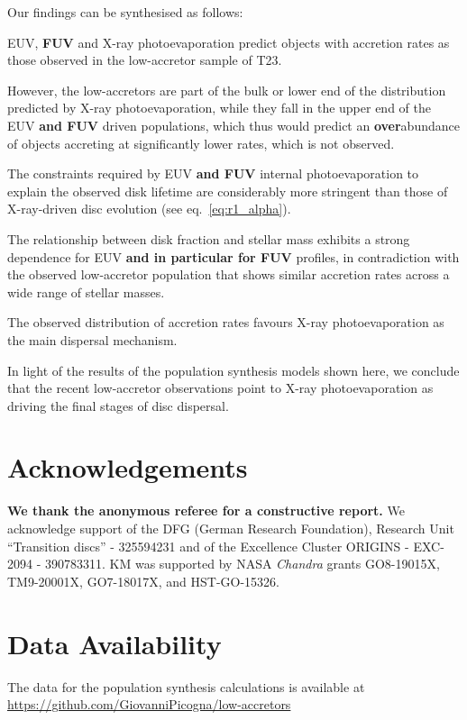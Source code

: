 \documentclass[fleqn,usenatbib]{mnras}
\begin{document}
Our findings can be synthesised as follows:
\begin{itemize}
  \item EUV, \textbf{FUV} and X-ray photoevaporation predict objects with accretion rates as those observed in the low-accretor sample of T23.	
	\item However, the low-accretors are part of the bulk or lower end of the distribution predicted by X-ray photoevaporation, while they fall in the upper end of the EUV \textbf{and FUV} driven populations, which thus would predict an \textbf{over}abundance of objects accreting at significantly lower rates, which is not observed. 
 \item The constraints required by EUV \textbf{and FUV} internal photoevaporation to explain the observed disk lifetime are considerably more stringent than those of X-ray-driven disc evolution (see eq.~\ref{eq:r1_alpha}).
	\item The relationship between disk fraction and stellar mass exhibits a strong dependence for EUV \textbf{and in particular for FUV} profiles, in contradiction with the observed low-accretor population that shows similar accretion rates across a wide range of stellar masses.
 {\bf
 \item The observed distribution of accretion rates favours X-ray photoevaporation as the main dispersal mechanism. 
 }
 \end{itemize}
 
In light of the results of the population synthesis models shown here, we conclude that the recent low-accretor observations point to X-ray photoevaporation as driving the final stages of disc dispersal.

\section*{Acknowledgements}
{\bf We thank the anonymous referee for a constructive report.} 
We acknowledge support of the DFG (German Research Foundation), Research Unit ``Transition discs'' - 325594231 and of the Excellence Cluster ORIGINS - EXC-2094 - 390783311. KM was supported by NASA {\it Chandra} grants GO8-19015X, TM9-20001X, GO7-18017X, and HST-GO-15326.
\section*{Data Availability}

The data for the population synthesis calculations is available at \href{https://github.com/GiovanniPicogna/low-accretors}{https://github.com/GiovanniPicogna/low-accretors}







\appendix


\bsp	%
\label{lastpage}
\end{document}
